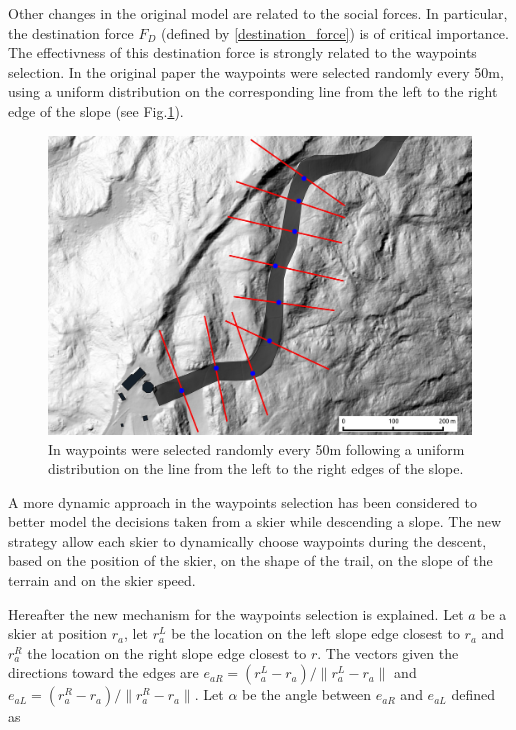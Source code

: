 \documentclass[12pt,a4paper,twoside]{book}
\newcommand{\norm}[1]{\lVert#1\rVert}
\begin{document}
Other changes in the original model are related to the social forces. In particular, the destination force $F_D$ (defined by \ref{destination_force}) is of critical importance. The effectivness of this destination force is strongly related to the waypoints selection. In the original paper the waypoints were selected randomly every 50m, using a uniform distribution on the corresponding line from the left to the right edge of the slope (see Fig.\ref{waypoints_old_pic}).

\begin{figure}
  \begin{center}
    \includegraphics[width=\textwidth]{images/waypoint_line.eps}
    \caption{In \cite{hol2012} waypoints were selected randomly every 50m following a uniform distribution on the line from the left to the right edges of the slope.}\label{waypoints_old_pic}
  \end{center}
\end{figure}

A more dynamic approach in the waypoints selection has been considered to better model the decisions taken from a skier while descending a slope. The new strategy allow each skier to dynamically choose waypoints during the descent, based on the position of the skier, on the shape of the trail, on the slope of the terrain and on the skier speed.

Hereafter the new mechanism for the waypoints selection is explained. Let $a$ be a skier at position $r_a$, let $r_a^L$ be the location on the left slope edge closest to $r_a$ and $r_a^R$ the location on the right slope edge closest to $r$. The vectors given the directions toward the edges are $e_{aR}=\left(r_a^L-r_a\right)/\norm{r_a^L-r_a}$ and $e_{aL}=\left(r_a^R-r_a\right)/\norm{r_a^R-r_a}$. Let $\alpha$ be the angle between $e_{aR}$ and $e_{aL}$ defined as
\end{document}
